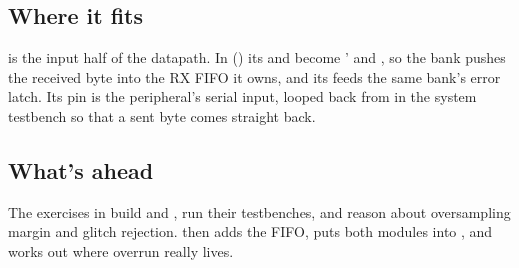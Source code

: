 \subsection{Where it fits}
\label{c3:sec:uart_rx_fits}
 is the input half of the datapath. In  () its 
and  become '  and , so the bank pushes
the received byte into the RX FIFO it owns, and its  feeds the same bank's error
latch. Its  pin is the peripheral's serial input, looped back from  in the system
testbench so that a sent byte comes straight back.

\subsection{What's ahead}
The exercises in  build  and , run their
testbenches, and reason about oversampling margin and glitch rejection.  then adds the
FIFO, puts both modules into , and works out where overrun really lives.
